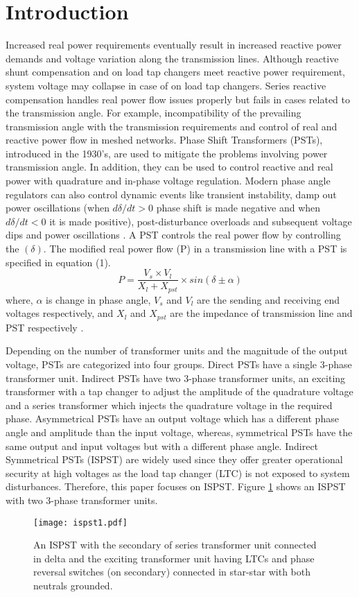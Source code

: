 \documentclass[conference]{IEEEtran}
\begin{document}
\section{Introduction}
Increased real power requirements eventually result in increased reactive power demands and voltage variation along the transmission lines. Although reactive shunt compensation and on load tap changers meet reactive power requirement, system voltage may collapse in case of on load tap changers. Series reactive compensation handles real power flow issues properly but fails in cases related to the transmission angle. For example, incompatibility of the prevailing transmission angle with the transmission requirements and control of real and reactive power flow in meshed networks. Phase Shift Transformers (PSTs), introduced in the 1930’s, are used to mitigate the problems involving power transmission angle. In addition, they can be used to control reactive and real power with quadrature and in-phase voltage regulation. Modern phase angle regulators can also control dynamic events like transient instability, damp out power oscillations (when $d\delta/dt>0$ phase shift is made negative and when $d\delta/dt<0$ it is made positive), post-disturbance overloads and subsequent voltage dips and power oscillations \cite{Facts}. A PST controls the real power flow by controlling the $(\delta)$. The modified real power flow (P) in a transmission line with a PST is specified in equation (1).
\begin{equation}
    P=\frac {V_s \times V_l}{X_l+ X_{pst}} \times sin(\delta \pm \alpha)
\end{equation}
where, $\alpha$ is change in phase angle, $V_s$ and $V_l$ are the  sending and receiving end voltages respectively, and $X_l$ and $X_{pst}$ are the impedance of transmission line and PST respectively \cite{Harlow}.

Depending on the number of transformer units and the magnitude of the output voltage, PSTs are categorized into four groups. Direct PSTs have a single 3-phase transformer unit. Indirect PSTs have two 3-phase transformer units, an exciting transformer with a tap changer to adjust the amplitude of the quadrature voltage and a series transformer which injects the quadrature voltage in the required phase. Asymmetrical PSTs have an output voltage which has a different phase angle and amplitude than the input voltage, whereas, symmetrical PSTs have the same output and input voltages but with a different phase angle. Indirect Symmetrical PSTs (ISPST) are widely used since they offer greater operational security at high voltages as the load tap changer (LTC) is not exposed to system disturbances. Therefore, this paper focuses on ISPST. Figure \ref{ispst} shows an ISPST with two 3-phase transformer units.
\begin{figure}[htp]
\centerline{\texttt{[image: ispst1.pdf]}}
\caption{An ISPST with the secondary of series transformer unit connected in delta and the exciting transformer unit having LTCs and phase reversal switches (on secondary) connected in star-star with both neutrals grounded. \cite{ibrahim}}
\label{ispst}
\end{figure}
\end{document}
